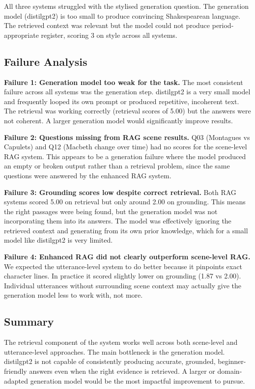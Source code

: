 \documentclass[10pt,conference]{IEEEtran}
\begin{document}
All three systems struggled with the stylised generation question.
The generation model (distilgpt2) is too small to produce convincing
Shakespearean language. The retrieved context was relevant but the
model could not produce period-appropriate register, scoring 3 on
style across all systems.

\subsection{Failure Analysis}

\textbf{Failure 1: Generation model too weak for the task.}
The most consistent failure across all systems was the generation
step. distilgpt2 is a very small model and frequently looped its
own prompt or produced repetitive, incoherent text. The retrieval
was working correctly (retrieval scores of 5.00) but the answers
were not coherent. A larger generation model would significantly
improve results.

\textbf{Failure 2: Questions missing from RAG scene results.}
Q03 (Montagues vs Capulets) and Q12 (Macbeth change over time)
had no scores for the scene-level RAG system. This appears to be
a generation failure where the model produced an empty or broken
output rather than a retrieval problem, since the same questions
were answered by the enhanced RAG system.

\textbf{Failure 3: Grounding scores low despite correct retrieval.}
Both RAG systems scored 5.00 on retrieval but only around 2.00 on
grounding. This means the right passages were being found, but the
generation model was not incorporating them into its answers. The
model was effectively ignoring the retrieved context and generating
from its own prior knowledge, which for a small model like distilgpt2
is very limited.

\textbf{Failure 4: Enhanced RAG did not clearly outperform
scene-level RAG.}
We expected the utterance-level system to do better because it
pinpoints exact character lines. In practice it scored slightly
lower on grounding (1.87 vs 2.00). Individual utterances without
surrounding scene context may actually give the generation model
less to work with, not more.

\subsection{Summary}

The retrieval component of the system works well across both
scene-level and utterance-level approaches. The main bottleneck is
the generation model. distilgpt2 is not capable of consistently
producing accurate, grounded, beginner-friendly answers even when
the right evidence is retrieved. A larger or domain-adapted
generation model would be the most impactful improvement to pursue.
\end{document}
